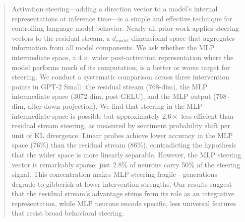 \begin{abstract}
Activation steering---adding a direction vector to a model's internal representations at inference time---is a simple and effective technique for controlling language model behavior. Nearly all prior work applies steering vectors to the residual stream, a $d_{\text{model}}$-dimensional space that aggregates information from all model components. We ask whether the MLP intermediate space, a $4\times$ wider post-activation representation where the model performs much of its computation, is a better or worse target for steering. We conduct a systematic comparison across three intervention points in GPT-2 Small: the residual stream (768-dim), the MLP intermediate space (3072-dim, post-GELU), and the MLP output (768-dim, after down-projection). We find that steering in the MLP intermediate space is possible but approximately $2.6\times$ less efficient than residual stream steering, as measured by sentiment probability shift per unit of KL divergence. Linear probes achieve lower accuracy in the MLP space (76\%) than the residual stream (86\%), contradicting the hypothesis that the wider space is more linearly separable. However, the MLP steering vector is remarkably sparse: just 2.8\% of neurons carry 50\% of the steering signal. This concentration makes MLP steering fragile---generations degrade to gibberish at lower intervention strengths. Our results suggest that the residual stream's advantage stems from its role as an integrative representation, while MLP neurons encode specific, less universal features that resist broad behavioral steering.
\end{abstract}

